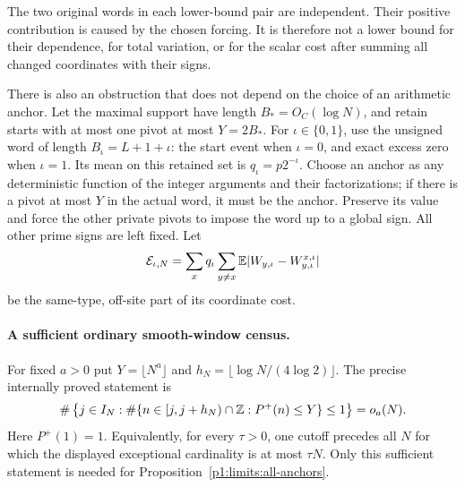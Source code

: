 The two original words in each lower-bound pair are
independent.  Their positive contribution is caused by
the chosen forcing.  It is therefore not a lower bound
for their dependence, for total variation, or for the
scalar cost after summing all changed coordinates with
their signs.

There is also an obstruction that does not depend on the
choice of an arithmetic anchor.  Let the maximal support
have length $B_*=O_C(\log N)$, and retain starts with at
most one pivot at most $Y=2B_*$.  For $\iota\in\{0,1\}$,
use the unsigned word of length $B_\iota=L+1+\iota$:
the start event when $\iota=0$, and exact excess zero
when $\iota=1$.  Its mean on this retained set is
$q_\iota=p2^{-\iota}$.  Choose an anchor as any deterministic
function of the integer arguments and their factorizations;
if there is a pivot at most $Y$ in the actual word, it must
be the anchor.  Preserve its value and force the other
private pivots to impose the word up to a global sign.
All other prime signs are left fixed.  Let
\[
 \mathcal E_{\iota,N}
 =\sum_xq_\iota\sum_{y\ne x}
       \mathbb E|W_{y,\iota}-W^{x,\iota}_{y,\iota}|
\]
be the same-type, off-site part of its coordinate cost.

\paragraph{A sufficient ordinary smooth-window census.}
\label{p18:limits:smooth-census}
For fixed $a>0$ put $Y=\lfloor N^a\rfloor$ and
$h_N=\lfloor\log N/(4\log2)\rfloor$.
The precise internally proved statement is
\[
 \#\left\{j\in I_N:
   \#\{n\in[j,j+h_N)\cap\mathbb Z:P^+(n)\leq Y\}\leq1\right\}
   =o_a(N).
\]
Here $P^+(1)=1$.  Equivalently, for every $\tau>0$, one cutoff
precedes all $N$ for which the displayed exceptional cardinality
is at most $\tau N$.
Only this sufficient statement is needed for
Proposition~\ref{p1:limits:all-anchors}.

